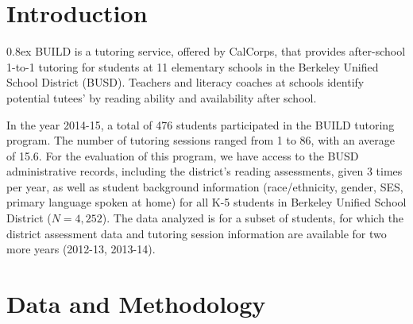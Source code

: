 \documentclass[a0,landscape]{a0poster}
\begin{document}
\vspace{0.5cm} %



\begin{multicols}{3} %



\color{SaddleBrown} %

\section*{Introduction}

\parskip 0.8ex
BUILD is a tutoring service, offered by CalCorps, that provides
after-school 1-to-1 tutoring for students at 11 elementary schools
in the Berkeley Unified School District (BUSD).
Teachers and literacy coaches at schools identify potential tutees'
by reading ability and availability after school.

In the year 2014-15, a total of 476 students participated in the
BUILD tutoring program. The number of tutoring sessions ranged
from 1 to 86, with an average of 15.6.
For the evaluation of this program, we have access to the BUSD
administrative records, including the district's reading assessments,
given 3 times per year, as well as student background information
(race/ethnicity, gender, SES, primary language spoken at home)
for all K-5 students in Berkeley Unified School District ($N = 4,252$).
The data analyzed is for a subset of students, for which the district
assessment data and tutoring session information are available
for two more years (2012-13, 2013-14).


\color{NavyBlue}
\section*{Data and Methodology}


\end{multicols}
\end{document}
